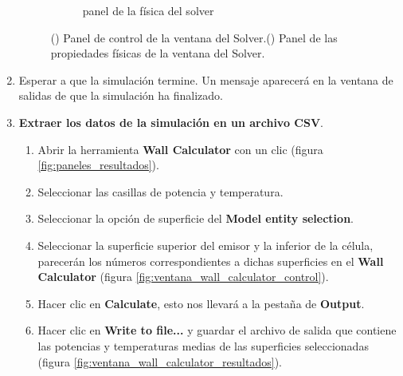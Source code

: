 \begin{enumerate}
\begin{figure}[H]
\begin{subfigure}[b]{0.48\textwidth}
			\caption{panel de la física del solver}
			\label{fig:physics_panel}
		\end{subfigure}
		\caption{() Panel de control de la ventana del Solver.() Panel de las propiedades físicas de la ventana del Solver.}
		\label{fig:panels_Solver}
	\end{figure}
	\item Esperar a que la simulación termine. Un mensaje aparecerá en la ventana de salidas de que la simulación ha finalizado.
	\item \textbf{Extraer los datos de la simulación en un archivo CSV}.\label{it:extraerResCFD}
	\begin{enumerate}
		\item Abrir la herramienta \textbf{Wall Calculator} con un clic (figura \ref{fig:paneles_resultados}).
		\item Seleccionar las casillas de potencia y temperatura.
		\item Seleccionar la opción de superficie del \textbf{Model entity selection}.
		\item Seleccionar la superficie superior del emisor y la inferior de la célula, parecerán los números correspondientes a dichas superficies en el \textbf{Wall Calculator} (figura \ref{fig:ventana_wall_calculator_control}).
		\item Hacer clic en \textbf{Calculate}, esto nos llevará a la pestaña de \textbf{Output}.
		\item Hacer clic en \textbf{Write to file...} y guardar el archivo de salida que contiene las potencias y temperaturas medias de las superficies seleccionadas (figura \ref{fig:ventana_wall_calculator_resultados}).
	\end{enumerate}
	\begin{figure}[H]
		\centering
		\begin{subfigure}[b]{0.48\textwidth}
			\centering

\end{subfigure}
\end{figure}
\end{enumerate}
